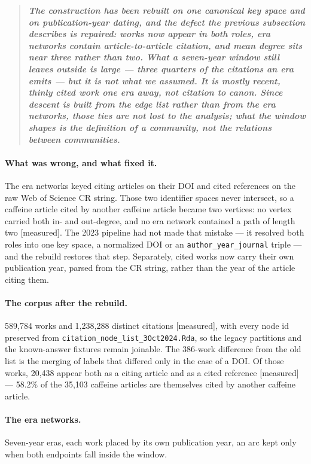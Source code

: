\documentclass[11pt]{article}
\newcommand{\meas}{{\footnotesize\textsf{[measured]}}}
\newcommand{\code}[1]{\texttt{\small #1}}
\begin{document}
\begin{quote}
	\textbf{\itshape The construction has been rebuilt on one canonical key space and on
	publication-year dating, and the defect the previous subsection describes is repaired:
	works now appear in both roles, era networks contain article-to-article citation, and mean
	degree sits near three rather than two. What a seven-year window still leaves outside is
	large --- three quarters of the citations an era emits --- but it is not what we assumed.
	It is mostly recent, thinly cited work one era away, not citation to canon. Since descent
	is built from the edge list rather than from the era networks, those ties are not lost to
	the analysis; what the window shapes is the definition of a community, not the relations
	between communities.}
\end{quote}

\paragraph{What was wrong, and what fixed it.} The era networks keyed citing articles on
their DOI and cited references on the raw Web of Science CR string. Those two identifier
spaces never intersect, so a caffeine article cited by another caffeine article became two
vertices: no vertex carried both in- and out-degree, and no era network contained a path of
length two \meas{}. The 2023 pipeline had not made that mistake --- it resolved both roles
into one key space, a normalized DOI or an \code{author\_year\_journal} triple --- and the
rebuild restores that step. Separately, cited works now carry their own publication year,
parsed from the CR string, rather than the year of the article citing them.

\paragraph{The corpus after the rebuild.} 589{,}784 works and 1{,}238{,}288 distinct
citations \meas{}, with every node id preserved from
\code{citation\_node\_list\_3Oct2024.Rda}, so the legacy partitions and the known-answer
fixtures remain joinable. The 386-work difference from the old list is the merging of
labels that differed only in the case of a DOI. Of those works, 20{,}438 appear both as a
citing article and as a cited reference \meas{} --- 58.2\% of the 35{,}103 caffeine articles
are themselves cited by another caffeine article.

\paragraph{The era networks.} Seven-year eras, each work placed by its own publication year,
an arc kept only when both endpoints fall inside the window.
\end{document}
